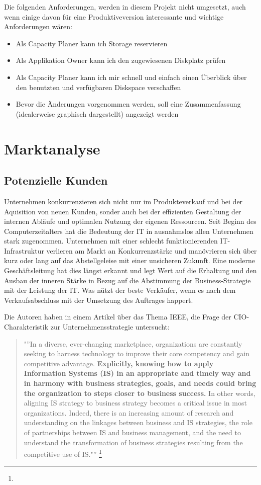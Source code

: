 Die folgenden Anforderungen, werden in diesem Projekt nicht umgesetzt, auch wenn einige davon für eine Produktiveversion interessante und wichtige Anforderungen wären:

\begin{itemize}
\item Als Capacity Planer kann ich Storage reservieren
\item Als Applikation Owner kann ich den zugewiesenen Diskplatz prüfen
\item Als Capacity Planer kann ich mir schnell und einfach einen Überblick über den benutzten und verfügbaren Diskspace verschaffen
\item Bevor die Änderungen vorgenommen werden, soll eine Zusammenfassung (idealerweise graphisch dargestellt) angezeigt werden
\end{itemize}


\section{Marktanalyse}
\subsection{Potenzielle Kunden}
Unternehmen konkurrenzieren sich nicht nur im Produkteverkauf und bei der Aquisition von neuen Kunden, sonder auch bei der effizienten Gestaltung der internen Abläufe und optimalen Nutzung der eigenen Ressourcen. Seit Beginn des Computerzeitalters hat die Bedeutung der IT in ausnahmslos allen Unternehmen stark zugenommen. Unternehmen mit einer schlecht funktionierenden IT-Infrastruktur verlieren am Markt an Konkurrenzstärke und manövrieren sich über kurz oder lang auf das Abstellgeleise mit einer unsicheren Zukunft. Eine moderne Geschäftsleitung hat dies längst erkannt und legt Wert auf die Erhaltung und den Ausbau der inneren Stärke in Bezug auf die Abstimmung der Business-Strategie mit der Leistung der IT. Was nützt der beste Verkäufer, wenn es nach dem Verkaufsabschluss mit der Umsetzung des Auftrages happert.

Die Autoren  haben in einem Artikel über das Thema IEEE, die Frage der CIO-Charakteristik zur Unternehmensstrategie untersucht:

\begin{quote}
"''In a diverse, ever-changing marketplace, organizations are constantly seeking to harness technology to improve their core competency and gain competitive advantage. \textbf{Explicitly, knowing how to apply Information Systems (IS) in an appropriate and timely way and in harmony with business strategies, goals, and needs could bring the organization to steps closer to business success.} In other words, aligning IS strategy to business strategy becomes a critical issue in most organizations. Indeed, there is an increasing amount of research and understanding on the linkages between business and IS strategies, the role of partnerships between IS and business management, and the need to understand the transformation of business strategies resulting from the competitive use of IS."'' \footnote{}
\end{quote}


